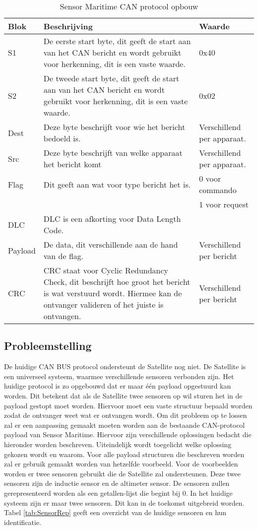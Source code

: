 \begin{table}[h!]
	\caption{Sensor Maritime CAN protocol opbouw}
	\label{tab:cansensorprotocol}
	\begin{tabular}{p{1.5cm}p{11.5cm}p{3cm}}
	\toprule
	\textbf{Blok} & \textbf{Beschrijving} & \textbf{Waarde}\\ \midrule
	S1		& De eerste start byte, dit geeft de start aan van het CAN bericht en wordt gebruikt voor herkenning, dit is een vaste waarde.	& 0x40 \\
	S2		& De tweede start byte, dit geeft de start aan van het CAN bericht en wordt gebruikt voor herkenning, dit is een vaste waarde. & 0x02 \\
	Dest	& Deze byte beschrijft voor wie het bericht bedoeld is.		& Verschillend per apparaat. \\
	Src		& Deze byte beschrijft van welke apparaat het bericht komt	& Verschillend per apparaat.\\ 
	Flag	& Dit geeft aan wat voor type bericht het is.             & 0 voor commando \\ 
			& & 1 voor request \\ 
	DLC		& DLC is een afkorting voor Data Length Code.             & \\ 
	Payload	& De data, dit verschillende aan de hand van de flag. & Verschillend per bericht\\
	CRC		& CRC staat voor Cyclic Redundancy Check, dit beschrijft hoe groot het bericht is wat verstuurd wordt. Hiermee kan de ontvanger valideren of het juiste is ontvangen. & Verschillend per bericht\\ \bottomrule
	\end{tabular}
\end{table}

\newpage
\subsection{Probleemstelling}
De huidige CAN BUS protocol ondersteunt de Satellite nog niet. De Satellite is een universeel systeem, waarmee verschillende sensoren verbonden zijn. Het huidige protocol is zo opgebouwd dat er maar één payload opgestuurd kan worden. Dit betekent dat als de Satellite twee sensoren op wil sturen het in de payload gestopt moet worden. Hiervoor moet een vaste structuur bepaald worden zodat de ontvanger weet wat er ontvangen wordt. Om dit probleem op te lossen zal er een aanpassing gemaakt moeten worden aan de bestaande CAN-protocol payload van Sensor Maritime. Hiervoor zijn verschillende oplossingen bedacht die hieronder worden beschreven. Uiteindelijk wordt toegelicht welke oplossing gekozen wordt en waarom. Voor alle payload structuren die beschreven worden zal er gebruik gemaakt worden van hetzelfde voorbeeld. Voor de voorbeelden worden er twee sensoren gebruikt die de Satellite zal ondersteunen. Deze twee sensoren zijn de inductie sensor en de altimeter sensor. De sensoren zullen gerepresenteerd worden als een getallen-lijst die begint bij 0. In het huidige systeem zijn er maar twee sensoren. Dit kan in de toekomst uitgebreid worden. Tabel \ref{tab:SensorRep} geeft een overzicht van de huidige sensoren en hun identificatie.

